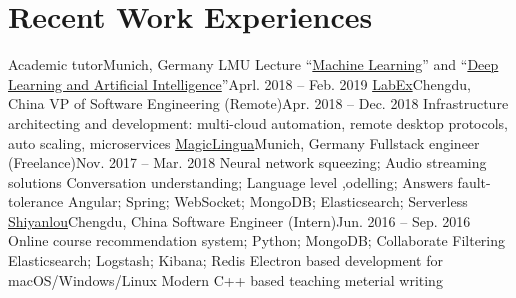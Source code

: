 \section{\textbf{Recent Work Experiences}}
  \resumeSubHeadingListStart
    \resumeSubheading
      {Academic tutor}{Munich, Germany}
      {LMU Lecture ``\href{http://www.dbs.ifi.lmu.de/cms/studium_lehre/lehre_master/ml18/index.html}{Machine Learning}'' and ``\href{http://www.dbs.ifi.lmu.de/cms/studium_lehre/lehre_master/deep1819/index.html}{Deep Learning and Artificial Intelligence}''}{Aprl. 2018 -- Feb. 2019}
      \resumeItemListStart
      \resumeItemListEnd
    \resumeSubheading
      {\href{https://labex.io/}{LabEx}}{Chengdu, China}
      {VP of Software Engineering (Remote)}{Apr. 2018 -- Dec. 2018}
      \resumeItemListStart
          {Infrastructure architecting and development: multi-cloud automation, remote desktop protocols, auto scaling, microservices}
      \resumeItemListEnd
    \resumeSubheading
    {\href{https://magiclingua.com/}{MagicLingua}}{Munich, Germany}
    {Fullstack engineer (Freelance)}{Nov. 2017 -- Mar. 2018}
    \resumeItemListStart
        {Neural network squeezing; Audio streaming solutions}
        {Conversation understanding; Language level ,odelling; Answers fault-tolerance}
        {Angular; Spring; WebSocket; MongoDB; Elasticsearch; Serverless}
    \resumeItemListEnd
   \resumeSubheading
     {\href{https://shiyanlou.com/}{Shiyanlou}}{Chengdu, China}
     {Software Engineer (Intern)}{Jun. 2016 -- Sep. 2016}
     \resumeItemListStart
          {Online course recommendation system; Python; MongoDB; Collaborate Filtering}
          {Elasticsearch; Logstash; Kibana; Redis}
          {Electron based development for macOS/Windows/Linux}
          {Modern C++ based teaching meterial writing}
     \resumeItemListEnd
  \resumeSubHeadingListEnd